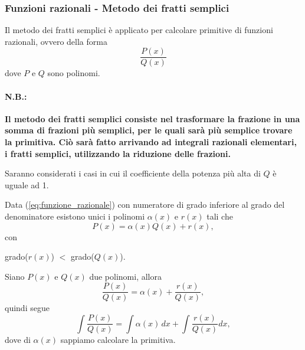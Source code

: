 \subsubsection{Funzioni razionali - Metodo dei fratti semplici}
Il metodo dei fratti semplici è applicato per calcolare primitive di funzioni razionali, ovvero della forma
\begin{equation}\label{eq:funzione_razionale}
    \frac{P(x)}{Q(x)}
\end{equation}
dove $P$ e $Q$ sono \gls{polinomi}. 

\paragraph{N.B.:} \textbf{Il metodo dei fratti semplici consiste nel trasformare la frazione in una somma di frazioni più semplici, per le quali sarà più semplice trovare la primitiva. Ciò sarà fatto arrivando ad integrali razionali elementari, i fratti semplici, utilizzando la riduzione delle frazioni.}

\noindent Saranno considerati i casi in cui il coefficiente della potenza più alta di $Q$ è uguale ad 1.

\label{sssec:riduzione_grado_numeratore}
\begin{proposition}
    Data (\ref{eq:funzione_razionale}) con numeratore di grado inferiore al grado del denominatore esistono unici i polinomi $\alpha(x)$ e $r(x)$ tali che
    \begin{equation*}
        P(x) =  \alpha(x) Q(x) + r(x),
    \end{equation*}
    con
    \begin{center}
        grado($r(x)$) $<$ grado($Q(x)$).
    \end{center}
\end{proposition}

\begin{remark}
    Siano $P(x)$ e $Q(x)$ due \gls{polinomi}, allora
    \begin{equation*}
        \frac{P(x)}{Q(x)}=\alpha(x)+\frac{r(x)}{Q(x)},
    \end{equation*}
    quindi segue
    \begin{equation*}
        \int \frac{P(x)}{Q(x)} = \int\alpha(x)\, dx + \int\frac{r(x)}{Q(x)} dx,
    \end{equation*}
    dove di $\alpha(x)$ sappiamo calcolare la primitiva.
\end{remark}

